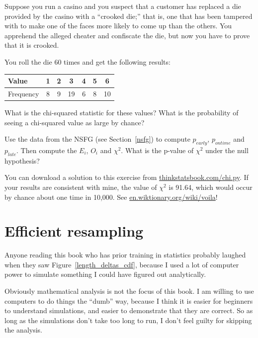 \documentclass[12pt]{book}
\begin{document}
\begin{ex}

Suppose you run a casino and you suspect that a customer has
replaced a die provided by the casino with a ``crooked die;'' that
is, one that has been tampered with to make one of the faces more
likely to come up than the others.  You apprehend the alleged
cheater and confiscate the die, but now you have to prove that it
is crooked.

You roll the die 60 times and get the following results:

\begin{center}
\begin{tabular}{|l|c|c|c|c|c|c|}
\hline
Value     &  1  &  2  &  3  &  4  &  5  &  6  \\ 
\hline
\hline
Frequency &  8  &  9  &  19  &  6  &  8  &  10  \\
\hline
\end{tabular}
\end{center}

What is the chi-squared statistic for these values?  What is the
probability of seeing a chi-squared value as large by chance?

\end{ex}


\begin{ex}

Use the data from the NSFG (see Section~\ref{nsfg}) to compute
$p_{early}$, $p_{ontime}$ and $p_{late}$.  Then compute the $E_i$,
$O_i$ and $\chi^2$.  What is the p-value of $\chi^2$ under the null
hypothesis?

You can download a solution to this exercise from
\url{thinkstatsbook.com/chi.py}.  If your results are consistent with
mine, the value of $\chi^2$ is 91.64, which would occur by chance
about one time in 10,000.  See \url{en.wiktionary.org/wiki/voila}!

\end{ex}



\section{Efficient resampling}

Anyone reading this book who has prior training in statistics probably
laughed when they saw Figure~\ref{length_deltas_cdf}, because I used a
lot of computer power to simulate something I could have figured out
analytically.

Obviously mathematical analysis is not the focus of this book.  I am
willing to use computers to do things the ``dumb'' way, because I
think it is easier for beginners to understand simulations, and easier
to demonstrate that they are correct.  So as long as the simulations
don't take too long to run, I don't feel guilty for skipping the
analysis.
\end{document}
